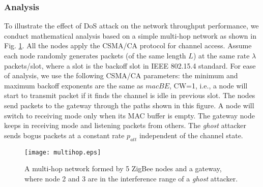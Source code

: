 \documentclass[10pt,journal,cspaper,compsoc]{IEEEtran}
\begin{document}
\subsubsection{Analysis}\label{sec:dos:analysis}
To illustrate the effect of DoS attack on the network throughput performance, we conduct mathematical analysis based on a simple multi-hop network as shown in Fig. \ref{fig_multihop}. All the nodes apply the CSMA/CA protocol for channel access. Assume each node randomly generates packets (of the same length $L$) at the same rate $\lambda$ packets/slot, where a slot is the backoff slot in IEEE 802.15.4 standard. For ease of analysis, we use the following CSMA/CA parameters: the minimum and maximum backoff exponents are the same as $macBE$, CW=1, i.e., a node will start to transmit packet if it finds the channel is idle in previous slot. The nodes send packets to the gateway through the paths shown in this figure. A node will switch to receiving mode only when its MAC buffer is empty. The gateway node keeps in receiving mode and listening packets from others. The {\em ghost} attacker sends bogus packets at a constant rate $p_{att}$ independent of the channel state.
\begin{figure}[htbp]
    \centering
    \texttt{[image: multihop.eps]}
    \caption{A multi-hop network formed by 5 ZigBee nodes and a gateway, where node 2 and 3 are in the interference range of a {\em ghost} attacker.}
    \label{fig_multihop}
\vspace{-3mm}
\end{figure}
\end{document}
